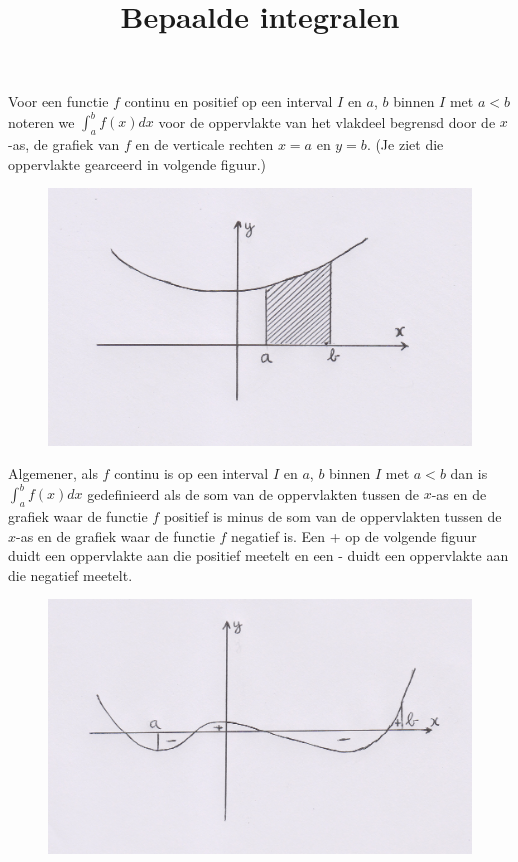 \documentclass{article}
\title{Bepaalde integralen}
\date { }
\begin{document}
\maketitle \noindent

\noindent Voor een functie $f$ continu en positief op een interval $I$ en $a$, $b$ binnen $I$ met $a<b$ noteren we $\int^b_a f(x)dx$ voor de oppervlakte van het vlakdeel begrensd door de $x$-as, de grafiek van $f$ en de verticale rechten $x=a$ en $y=b$.
(Je ziet die oppervlakte gearceerd in volgende figuur.)

\begin{figure}[h]
\begin{center}
\includegraphics[height=5 cm]{integraal1.JPG}
\end{center}
\end{figure}

\noindent Algemener, als $f$ continu is op een interval $I$ en $a$, $b$ binnen $I$ met $a<b$ dan is $\int ^b_a f(x)dx$ gedefinieerd als de som van de oppervlakten tussen de $x$-as en de grafiek waar de functie $f$ positief is minus de som van de oppervlakten tussen de $x$-as en de grafiek waar de functie $f$ negatief is.
Een + op de volgende figuur duidt een oppervlakte aan die positief meetelt en een - duidt een oppervlakte aan die negatief meetelt.\\

\begin{figure}[h]
\begin{center}
\includegraphics[height=5 cm]{integraal2.JPG}
\end{center}
\end{figure}
\end{document}
